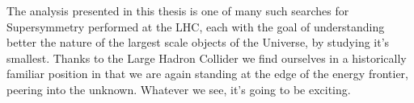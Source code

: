 The analysis presented in this thesis is one of many such searches for
Supersymmetry performed at the LHC, each with the goal of understanding better
the nature of the largest scale objects of the Universe, by studying it's
smallest. Thanks to the Large Hadron Collider we find ourselves in a
historically familiar position in that we are again standing at the edge of the
energy frontier, peering into the unknown. Whatever we see, it's going to be
exciting.



